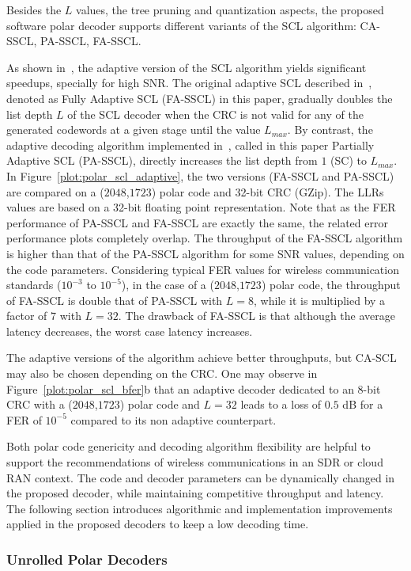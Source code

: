 Besides the $L$ values, the tree pruning and quantization aspects, the proposed
software polar decoder supports different variants of the SCL algorithm:
CA-SSCL, PA-SSCL, FA-SSCL.

As shown in~\cite{Sarkis2016}, the adaptive version of the SCL algorithm yields
significant speedups, specially for high SNR. The original adaptive SCL
described in~\cite{Li2012}, denoted as Fully Adaptive SCL (FA-SSCL) in this
paper, gradually doubles the list depth $L$ of the SCL decoder when the CRC is
not valid for any of the generated codewords at a given stage until the value
$L_{max}$. By contrast, the adaptive decoding algorithm implemented
in~\cite{Sarkis2016}, called in this paper Partially Adaptive SCL (PA-SSCL),
directly increases the list depth from $1$ (SC) to $L_{max}$. In
Figure~\ref{plot:polar_scl_adaptive}, the two versions (FA-SSCL and PA-SSCL) are
compared on a ($2048$,$1723$) polar code and 32-bit CRC (GZip). The LLRs values
are based on a 32-bit floating point representation. Note that as the FER
performance of PA-SSCL and FA-SSCL are exactly the same, the related error
performance plots completely overlap. The throughput of the FA-SSCL algorithm is
higher than that of the PA-SSCL algorithm for some SNR values, depending on the
code parameters. Considering typical FER values for wireless communication
standards ($10^{-3}$ to $10^{-5}$), in the case of a ($2048$,$1723$) polar code,
the throughput of FA-SSCL is double that of PA-SSCL with $L = 8$, while it is
multiplied by a factor of $7$ with $L=32$. The drawback of FA-SSCL is that
although the average latency decreases, the worst case latency increases.

The adaptive versions of the algorithm achieve better throughputs, but CA-SCL
may also be chosen depending on the CRC. One may observe in
Figure~\ref{plot:polar_scl_bfer}b that an adaptive decoder dedicated to an 8-bit
CRC with a ($2048$,$1723$) polar code and $L=32$ leads to a loss of $0.5$ dB for
a FER of $10^{-5}$ compared to its non adaptive counterpart.

Both polar code genericity and decoding algorithm flexibility are helpful to
support the recommendations of wireless communications in an SDR or cloud RAN
context. The code and decoder parameters can be dynamically changed in the
proposed decoder, while maintaining competitive throughput and latency. The
following section introduces algorithmic and implementation improvements applied
in the proposed decoders to keep a low decoding time.

\subsubsection{Unrolled Polar Decoders}

